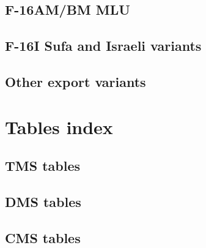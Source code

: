 \documentclass[11pt,a4paper]{article}
\begin{document}
\subsection{F-16AM/BM MLU}



\subsection{F-16I Sufa and Israeli variants}


\subsection{Other export variants}



\section{Tables index}

\subsection{TMS tables}



\subsection{DMS tables}



\subsection{CMS tables}
\end{document}
